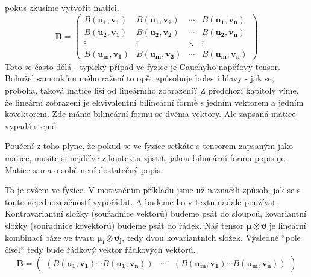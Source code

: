 \documentclass[a5paper,12pt]{amsbook}
\theoremstyle{definition}
\newcommand{\myvec}[1]{\bm{#1}}
\newcommand{\mymatrix}[1]{\mathbf{#1}}
\begin{document}
pokus zkusíme vytvořit matici.
\begin{equation*}
\mymatrix{B} = 
\left(\begin{array}{cccc}
  B(\myvec{u_1}, \myvec{v_1}) & B(\myvec{u_1}, \myvec{v_2}) & \cdots & B(\myvec{u_1}, \myvec{v_n}) \\
  B(\myvec{u_2}, \myvec{v_1}) & B(\myvec{u_2}, \myvec{v_2}) & \cdots & B(\myvec{u_2}, \myvec{v_n}) \\
  \vdots & \vdots & \ddots & \vdots \\
  B(\myvec{u_m}, \myvec{v_1}) & B(\myvec{u_m}, \myvec{v_2}) & \cdots & B(\myvec{u_m}, \myvec{v_n})
\end{array}\right)
\end{equation*}
Toto se často dělá - typický případ ve fyzice je Cauchyho napěťový tensor. Bohužel samoukům mého
ražení to opět způsobuje bolesti hlavy - jak se, proboha, taková matice liší od lineárního zobrazení?
Z předchozí kapitoly víme, že lineární zobrazení je ekvivalentní bilineární formě s jedním vektorem
a jedním kovektorem. Zde máme bilineární formu se dvěma vektory. Ale zapsaná matice vypadá stejně.

Poučení z toho plyne, že pokud se ve fyzice setkáte s tensorem zapsaným jako matice, musíte si
nejdříve z kontextu zjistit, jakou bilineární formu popisuje. Matice sama o sobě není dostatečný
popis.

To je ovšem ve fyzice. V motivačním příkladu jsme už naznačili způsob, jak se s touto nejednoznačností
vypořádat. A budeme ho v textu nadále používat. Kontravariantní složky (souřadnice vektorů)
budeme psát do sloupců, kovariantní složky (souřadnice kovektorů) budeme psát do řádek. Náš tensor
$\myvec{\mu}\otimes\myvec{\vartheta}$ je lineární kombinací báze ve tvaru
$\myvec{\mu_i}\otimes\myvec{\vartheta_j}$, tedy dvou kovariantních složek. Výsledné ``pole čísel``
tedy bude řádkový vektor řádkových vektorů.
\begin{equation*}
\mymatrix{B} = 
\left(\begin{array}{ccc}
  \left(
    B(\myvec{u_1}, \myvec{v_1}) \cdots B(\myvec{u_1}, \myvec{v_n})
  \right) &
  \cdots &
  \left(
    B(\myvec{u_m}, \myvec{v_1}) \cdots B(\myvec{u_m}, \myvec{v_n})
  \right)
\end{array}\right)
\end{equation*}
\end{document}
